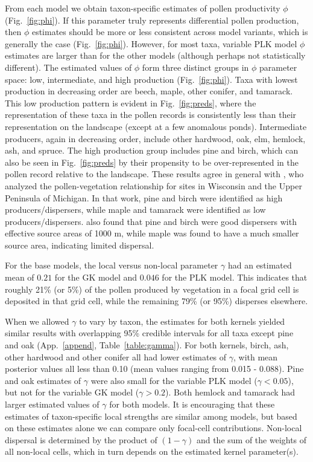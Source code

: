 \documentclass[12pt]{article}
\begin{document}
From each model we obtain taxon-specific estimates of pollen
productivity $\phi$ (Fig.~\ref{fig:phi}). If this parameter truly
represents differential pollen production, then $\phi$ estimates
should be more or less consistent across model variants, which is
generally the case (Fig.~\ref{fig:phi}). However, for most taxa,
variable PLK model $\phi$ estimates are larger than for the other
models (although perhaps not statistically different). The estimated
values of $\phi$ form three distinct groups in $\phi$ parameter space:
low, intermediate, and high production (Fig.~\ref{fig:phi}). Taxa with
lowest production in decreasing order are beech, maple, other conifer,
and tamarack. This low production pattern is evident in
Fig.~\ref{fig:preds}, where the representation of these taxa in the
pollen records is consistently less than their representation on the
landscape (except at a few anomalous ponds). Intermediate producers,
again in decreasing order, include other hardwood, oak, elm, hemlock,
ash, and spruce. The high production group includes pine and birch,
which can also be seen in Fig.~\ref{fig:preds} by their propensity to
be over-represented in the pollen record relative to the
landscape. These results agree in general with \citet{prentice1986},
who analyzed the pollen-vegetation relationship for sites in Wisconsin
and the Upper Peninsula of Michigan. In that work, pine and birch were
identified as high producers/dispersers, while maple and tamarack were
identified as low producers/dispersers. \citet{jackson1990} also found
that pine and birch were good dispersers with effective source areas
of 1000 m, while maple was found to have a much smaller source area,
indicating limited dispersal.


For the base models, the local versus non-local parameter $\gamma$ had
an estimated mean of $0.21$ for the GK model and $0.046$ for the PLK
model. This indicates that roughly 21\% (or 5\%) of the pollen
produced by vegetation in a focal grid cell is deposited in that grid
cell, while the remaining 79\% (or 95\%) disperses elsewhere.

When we allowed $\gamma$ to vary by taxon, the estimates for both
kernels yielded similar results with overlapping 95\% credible
intervals for all taxa except pine and oak
(App.~\ref{append}, Table~\ref{table:gamma}). For both kernels, birch, ash, other
hardwood and other conifer all had lower estimates of $\gamma$, with
mean posterior values all less than 0.10 (mean values ranging from
0.015 - 0.088). Pine and oak estimates of $\gamma$ were also small for
the variable PLK model ($\gamma < 0.05$), but not for the variable GK
model ($\gamma > 0.2$). Both hemlock and tamarack had larger estimated
values of $\gamma$ for both models. It is encouraging that these
estimates of taxon-specific local strengths are similar among models,
but based on these estimates alone we can compare only focal-cell
contributions. Non-local dispersal is determined by the product of
$(1-\gamma)$ and the sum of the weights of all non-local cells, which
in turn depends on the estimated kernel parameter(s).
\end{document}
